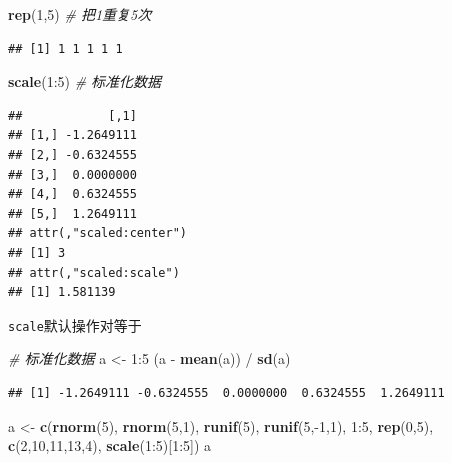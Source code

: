 \documentclass[]{article}
\newenvironment{Shaded}{\begin{snugshade}}{\end{snugshade}}
\newcommand{\KeywordTok}[1]{\textcolor[rgb]{0.13,0.29,0.53}{\textbf{{#1}}}}
\newcommand{\DecValTok}[1]{\textcolor[rgb]{0.00,0.00,0.81}{{#1}}}
\newcommand{\StringTok}[1]{\textcolor[rgb]{0.31,0.60,0.02}{{#1}}}
\newcommand{\CommentTok}[1]{\textcolor[rgb]{0.56,0.35,0.01}{\textit{{#1}}}}
\newcommand{\NormalTok}[1]{{#1}}
\numberwithin{figure}{section}
\numberwithin{table}{section}
\theoremstyle{definition}
\theoremstyle{definition}
\theoremstyle{definition}
\theoremstyle{remark}
\begin{document}
\begin{Shaded}
\begin{Highlighting}[]
\KeywordTok{rep}\NormalTok{(}\DecValTok{1}\NormalTok{,}\DecValTok{5}\NormalTok{) }\CommentTok{# 把1重复5次}
\end{Highlighting}
\end{Shaded}

\begin{verbatim}
## [1] 1 1 1 1 1
\end{verbatim}

\begin{Shaded}
\begin{Highlighting}[]
\KeywordTok{scale}\NormalTok{(}\DecValTok{1}\NormalTok{:}\DecValTok{5}\NormalTok{) }\CommentTok{# 标准化数据}
\end{Highlighting}
\end{Shaded}

\begin{verbatim}
##            [,1]
## [1,] -1.2649111
## [2,] -0.6324555
## [3,]  0.0000000
## [4,]  0.6324555
## [5,]  1.2649111
## attr(,"scaled:center")
## [1] 3
## attr(,"scaled:scale")
## [1] 1.581139
\end{verbatim}

\texttt{scale}默认操作对等于

\begin{Shaded}
\begin{Highlighting}[]
\CommentTok{# 标准化数据}
\NormalTok{a <-}\StringTok{ }\DecValTok{1}\NormalTok{:}\DecValTok{5}
\NormalTok{(a -}\StringTok{ }\KeywordTok{mean}\NormalTok{(a)) /}\StringTok{ }\KeywordTok{sd}\NormalTok{(a)}
\end{Highlighting}
\end{Shaded}

\begin{verbatim}
## [1] -1.2649111 -0.6324555  0.0000000  0.6324555  1.2649111
\end{verbatim}

\begin{Shaded}
\begin{Highlighting}[]
\NormalTok{a <-}\StringTok{ }\KeywordTok{c}\NormalTok{(}\KeywordTok{rnorm}\NormalTok{(}\DecValTok{5}\NormalTok{), }\KeywordTok{rnorm}\NormalTok{(}\DecValTok{5}\NormalTok{,}\DecValTok{1}\NormalTok{), }\KeywordTok{runif}\NormalTok{(}\DecValTok{5}\NormalTok{), }\KeywordTok{runif}\NormalTok{(}\DecValTok{5}\NormalTok{,-}\DecValTok{1}\NormalTok{,}\DecValTok{1}\NormalTok{), }\DecValTok{1}\NormalTok{:}\DecValTok{5}\NormalTok{, }\KeywordTok{rep}\NormalTok{(}\DecValTok{0}\NormalTok{,}\DecValTok{5}\NormalTok{), }\KeywordTok{c}\NormalTok{(}\DecValTok{2}\NormalTok{,}\DecValTok{10}\NormalTok{,}\DecValTok{11}\NormalTok{,}\DecValTok{13}\NormalTok{,}\DecValTok{4}\NormalTok{), }
        \KeywordTok{scale}\NormalTok{(}\DecValTok{1}\NormalTok{:}\DecValTok{5}\NormalTok{)[}\DecValTok{1}\NormalTok{:}\DecValTok{5}\NormalTok{])}
\NormalTok{a}
\end{Highlighting}
\end{Shaded}
\end{document}

